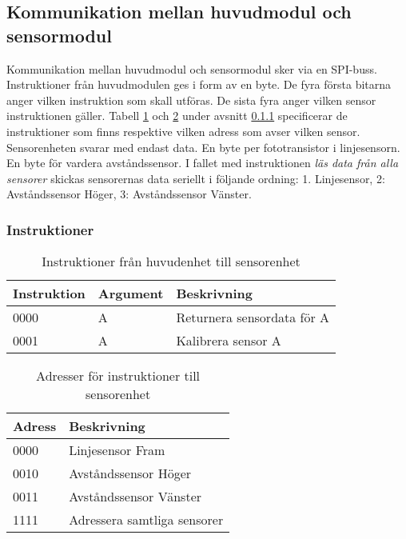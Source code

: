 \subsection{Kommunikation mellan huvudmodul och sensormodul}
Kommunikation mellan huvudmodul och sensormodul sker via en SPI-buss. Instruktioner från huvudmodulen ges i form av en byte. De fyra första bitarna anger vilken instruktion som skall utföras. De sista fyra anger vilken sensor instruktionen gäller. Tabell \ref{protokoll:huvud-sensor} och \ref{protokoll:huvud-sensor-adress} under avsnitt \ref{designspec:protokoll-huvud-sensor-instr} specificerar de instruktioner som finns respektive vilken adress som avser vilken sensor. \\
Sensorenheten svarar med endast data. En byte per fototransistor i linjesensorn. En byte för vardera avståndssensor. I fallet med instruktionen \textit{läs data från alla sensorer} skickas sensorernas data seriellt i följande ordning: 1. Linjesensor, 2: Avståndssensor Höger, 3: Avståndssensor Vänster.

\subsubsection{Instruktioner} \label{designspec:protokoll-huvud-sensor-instr}

\begin{table}[h]
	\centering
		\begin{tabularx}{\textwidth}{| l | l | X |}
			\hline
			\textbf{Instruktion} & \textbf{Argument} & \textbf{Beskrivning} \\
			\hline
			{0000} & {A} & {Returnera sensordata för A} \\
			\hline
			{0001} & {A} & {Kalibrera sensor A} \\
			\hline
		\end{tabularx}
	\caption{Instruktioner från huvudenhet till sensorenhet} \label{protokoll:huvud-sensor}
\end{table}

\begin{table}[h]
	\centering
		\begin{tabularx}{\textwidth}{| l | X |}
			\hline
			\textbf{Adress} & \textbf{Beskrivning} \\
			\hline
			{0000} & {Linjesensor Fram} \\
			\hline
			{0010} & {Avståndssensor Höger} \\
			\hline
			{0011} & {Avståndssensor Vänster} \\
			\hline
			{1111} & {Adressera samtliga sensorer} \\
			\hline
		\end{tabularx}
	\caption{Adresser för instruktioner till sensorenhet} \label{protokoll:huvud-sensor-adress}
\end{table}

